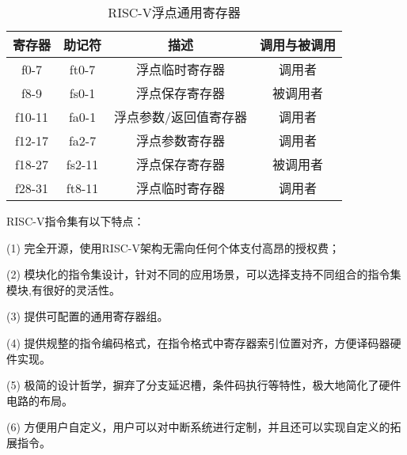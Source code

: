 \begin{table}[h]
  \centering
  \caption{RISC-V浮点通用寄存器}
  \label{tab:fpr}
  \begin{tabular}{cccc}
    \toprule
寄存器 &	助记符	& 描述 &	调用与被调用\\
    \midrule
    f0-7 & ft0-7 & 浮点临时寄存器 & 调用者\\
    f8-9 & fs0-1 & 浮点保存寄存器 & 被调用者\\
    f10-11 & fa0-1 & 浮点参数/返回值寄存器 & 调用者\\
    f12-17 & fa2-7 & 浮点参数寄存器 & 调用者\\
    f18-27 & fs2-11 & 浮点保存寄存器 & 被调用者\\
    f28-31 & ft8-11 & 浮点临时寄存器 & 调用者\\
    \bottomrule
  \end{tabular}
\end{table}


RISC-V指令集有以下特点：


(1) 完全开源，使用RISC-V架构无需向任何个体支付高昂的授权费；


(2) 模块化的指令集设计，针对不同的应用场景，可以选择支持不同组合的指令集模块,有很好的灵活性。


(3) 提供可配置的通用寄存器组。


(4) 提供规整的指令编码格式，在指令格式中寄存器索引位置对齐，方便译码器硬件实现。


(5) 极简的设计哲学，摒弃了分支延迟槽，条件码执行等特性，极大地简化了硬件电路的布局。


(6) 方便用户自定义，用户可以对中断系统进行定制，并且还可以实现自定义的拓展指令。
















